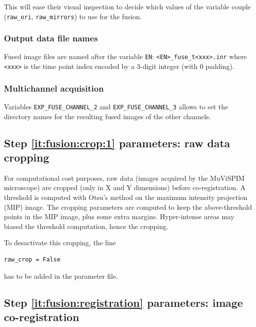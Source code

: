 \mbox{}
\mbox{}

This will ease their visual inspection to decide which values of the variable couple
(\texttt{raw\_ori}, \texttt{raw\_mirrors}) to use for the fusion.

\subsubsection{Output data file names}

Fused image files are named after the variable \texttt{EN}:
\texttt{<EN>\_fuse\_t<xxx>.inr} where \texttt{<xxx>} is the time point
index encoded by a 3-digit integer (with 0 padding).


\subsubsection{Multichannel acquisition}

Variables \texttt{EXP\_FUSE\_CHANNEL\_2} and
\texttt{EXP\_FUSE\_CHANNEL\_3} allows to set the directory names for
the resulting fused images of the other channels.

\subsection{Step \ref{it:fusion:crop:1} parameters: raw data cropping}
\label{sec:cli:fuse:raw:data:cropping}

For computational cost purposes, raw data (images acquired by the MuViSPIM microscope) are cropped (only in X and Y dimensions) before co-registration. A threshold is computed with Otsu's method \cite{otsu:tsmc:1979} on the maximum intensity projection (MIP) image. The cropping parameters are computed to keep the above-threshold points in the MIP image, plus some extra margins. Hyper-intense areas may biased the threshold computation, hence the cropping.

To desactivate this cropping, the line
\begin{verbatim}
raw_crop = False
\end{verbatim}
has to be added in the parameter file.

\subsection{Step \ref{it:fusion:registration} parameters: image co-registration}
\label{sec:cli:fuse:image:coregistration}

